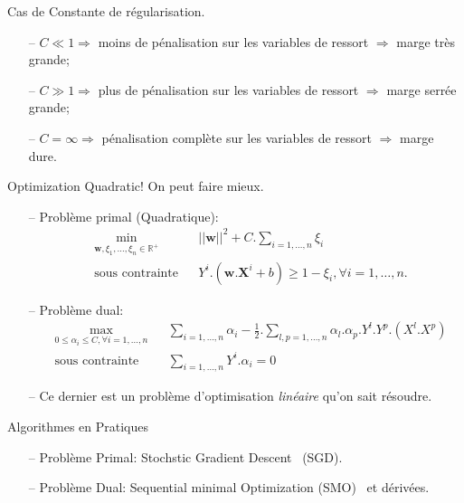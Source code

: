 \documentclass[9pt]{beamer}
\begin{document}
	\begin{frame}{Cas de Constante de régularisation.}
		\begin{itemize}
			\item[--] $C \ll 1 \Longrightarrow$ moins de pénalisation sur les variables de ressort $\Longrightarrow$ marge très grande;
			\item[--] $C \gg 1 \Longrightarrow$ plus de pénalisation sur les variables de ressort $\Longrightarrow$ marge serrée grande;
			\item[--] $C=\infty \Longrightarrow$ pénalisation complète sur les variables de ressort $\Longrightarrow$ marge dure.
		\end{itemize}
	\end{frame}
	\begin{frame}{Optimization Quadratic! On peut faire mieux.}
		\begin{itemize}
			\item[--] Problème primal (Quadratique):
			\begin{equation}
				\begin{aligned}
				& \min_{\textbf{w}, \xi_1,\dots,\xi_n \in \mathbb{R}^+}
				& & {\vert\vert \textbf{w} \vert\vert}^2 + C.\sum_{i=1,\dots,n}\xi_i \\
				& \text{sous contrainte}
				& & Y^i.(\textbf{w}.\textbf{X}^i + b) \geq 1 - \xi_i , \forall i = 1, \dots, n.
				\end{aligned}
			\end{equation}
			\item[--] Problème dual:
			\begin{equation}
				\begin{aligned}
				& \max_{0 \leq \alpha_i \leq C ,\forall i=1,\dots,n}
				& & \sum_{i=1,\dots,n} \alpha_i - \frac{1}{2}.\sum_{l,p=1,\dots,n}\alpha_l.\alpha_p.Y^l.Y^p.(X^l.X^p)\\
				& \text{sous contrainte}
				& & \sum_{i=1,\dots,n}Y^i.\alpha_i=0
				\end{aligned}
			\end{equation}
            \item[--] Ce dernier est un problème d'optimisation \textit{linéaire} qu'on sait résoudre.
		\end{itemize}
	\end{frame}
    \begin{frame}{Algorithmes en Pratiques}
		\begin{itemize}
			\item[--] Problème Primal: Stochstic Gradient Descent~\cite{bottou2010} (SGD).
            \item[--] Problème Dual: Sequential minimal Optimization (SMO)~\cite{platt1998sequential} et dérivées.
		\end{itemize}
	\end{frame}
\end{document}
